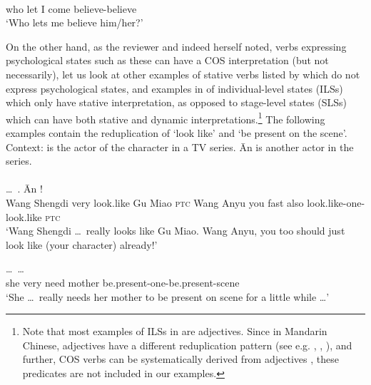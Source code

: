 \ex\label{ex:xiangxin}%
\gll {}    \\
who let I come believe-believe\\
\glt `Who lets me believe him/her?'
\z

On the other hand, as the reviewer %
and indeed \citet[669--670]{Tham2013} herself noted,
verbs expressing psychological states such as these can have a COS interpretation (but not necessarily),
let us look at other examples of stative verbs listed by \citet[680]{PeckEtAl2013} which do not express psychological states,
and examples in  \citet[Sec. 3.3.3]{XiaoMcEnery2004} of individual-level states (ILSs) which only have stative interpretation,
as opposed to stage-level states (SLSs) which can have both stative and dynamic interpretations.\footnote{
    Note that most examples of ILSs in \citet[Sec. 3.3.3]{XiaoMcEnery2004} are adjectives.
    Since in Mandarin Chinese, adjectives have a different reduplication pattern (see e.g. \citealt[Sec. 2.2]{Tsao2001}, \citealt[Sec. 4.1]{FanSongBond2015}, \citealt[Sec. 3]{Sui2018}),
    and further, COS verbs can be systematically derived from adjectives \citep[Sec. 3]{Tham2013},
    these predicates are not included in our examples.}
The following examples contain the reduplication of  `look like' and  `be present on the scene'.
\ea\label{ex:xiang}%
Context:   is the actor of the character   in a TV series.
 Ān is another actor in the series.\\
\\
\gll {}  \ldots\,     .  Ān     !\footnotemark\\
Wang Shengdi {} very look.like Gu Miao \textsc{ptc} Wang Anyu you fast also look.like-one-look.like \textsc{ptc}\\
\glt `Wang Shengdi \ldots\,  really looks like Gu Miao. Wang Anyu, you too should just look like (your character) already!'

\ex\label{ex:zaichang}%
 \ldots\,     \ldots\\
she {} very need mother be.present-one-be.present-scene\\
\glt `She \ldots\, really needs her mother to be present on scene for a little while \ldots'
\z
{}

